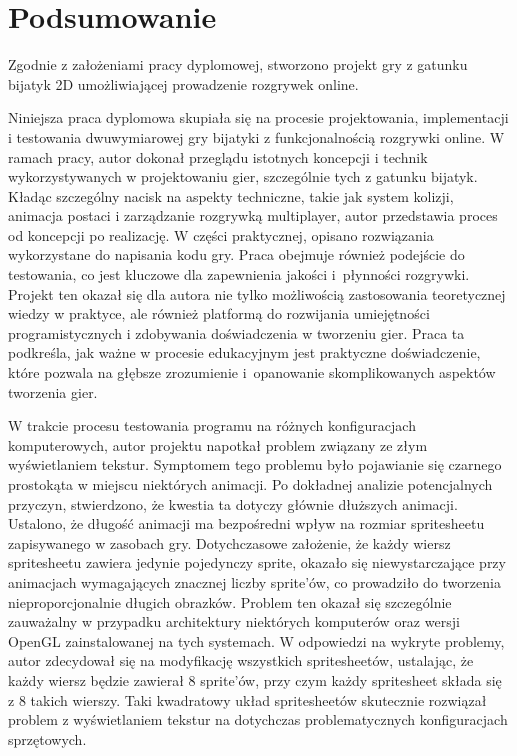 \chapter{Podsumowanie}
Zgodnie z założeniami pracy dyplomowej, stworzono projekt gry z gatunku bijatyk 2D umożliwiającej prowadzenie rozgrywek online.

Niniejsza praca dyplomowa skupiała się na procesie projektowania, implementacji i testowania dwuwymiarowej gry bijatyki z funkcjonalnością rozgrywki online. W ramach pracy, autor dokonał przeglądu istotnych koncepcji i technik wykorzystywanych w projektowaniu gier, szczególnie tych z gatunku bijatyk. Kładąc szczególny nacisk na aspekty techniczne, takie jak system kolizji, animacja postaci i zarządzanie rozgrywką multiplayer, autor przedstawia proces od koncepcji po realizację. W części praktycznej, opisano rozwiązania wykorzystane do napisania kodu gry. Praca obejmuje również podejście do testowania, co jest kluczowe dla zapewnienia jakości i~płynności rozgrywki. Projekt ten okazał się dla autora nie tylko możliwością zastosowania teoretycznej wiedzy w praktyce, ale również platformą do rozwijania umiejętności programistycznych i zdobywania doświadczenia w tworzeniu gier. Praca ta podkreśla, jak ważne w procesie edukacyjnym jest praktyczne doświadczenie, które pozwala na głębsze zrozumienie i~opanowanie skomplikowanych aspektów tworzenia gier.

W trakcie procesu testowania programu na różnych konfiguracjach komputerowych, autor projektu napotkał problem związany ze złym wyświetlaniem tekstur. Symptomem tego problemu było pojawianie się czarnego prostokąta w miejscu niektórych animacji. Po dokładnej analizie potencjalnych przyczyn, stwierdzono, że kwestia ta dotyczy głównie dłuższych animacji. Ustalono, że długość animacji ma bezpośredni wpływ na rozmiar spritesheetu zapisywanego w zasobach gry. Dotychczasowe założenie, że każdy wiersz spritesheetu zawiera jedynie pojedynczy sprite, okazało się niewystarczające przy animacjach wymagających znacznej liczby sprite'ów, co prowadziło do tworzenia nieproporcjonalnie długich obrazków. Problem ten okazał się szczególnie zauważalny w przypadku architektury niektórych komputerów oraz wersji OpenGL zainstalowanej na tych systemach. W odpowiedzi na wykryte problemy, autor zdecydował się na modyfikację wszystkich spritesheetów, ustalając, że każdy wiersz będzie zawierał 8 sprite'ów, przy czym każdy spritesheet składa się z 8 takich wierszy. Taki kwadratowy układ spritesheetów skutecznie rozwiązał problem z wyświetlaniem tekstur na dotychczas problematycznych konfiguracjach sprzętowych.

